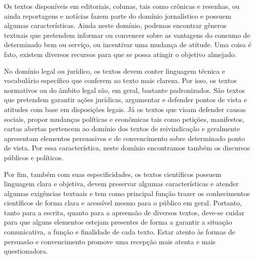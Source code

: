 {{Os textos disponíveis em editoriais, colunas, tais como crônicas e
resenhas, ou ainda reportagens e notícias fazem parte do domínio
jornalístico e possuem algumas características. Ainda neste domínio,
podemos encontrar gêneros textuais que pretendem informar ou convencer
sobre as vantagens do consumo de determinado bem ou serviço, ou
incentivar uma mudança de atitude. Uma coisa é fato, existem diversos
recursos para que se possa atingir o objetivo almejado.

No domínio legal ou jurídico, os textos devem conter linguagem técnica e
vocabulário específico que conferem ao texto mais clareza. Por isso, os
textos normativos ou do âmbito legal são, em geral, bastante
padronizados. São textos que pretendem garantir ações jurídicas,
argumentar e defender pontos de vista e atitudes com base em disposições
legais. Já os textos que visam defender causas sociais, propor mudanças
políticas e econômicas tais como petições, manifestos, cartas abertas
pertencem ao domínio dos textos de reivindicação e geralmente apresentam
elementos persuasivos e de convencimento sobre determinado ponto de
vista. Por essa característica, neste domínio encontramos também os
discursos públicos e políticos.

Por fim, também com suas especificidades, os textos científicos possuem
linguagem clara e objetiva, devem preservar algumas características e
atender algumas exigências textuais e tem como principal função trazer
os conhecimentos científicos de forma clara e acessível mesmo para o
público em geral. Portanto, tanto para a escrita, quanto para a
apreensão de diversos textos, deve-se cuidar para que alguns elementos
estejam presentes de forma a garantir a situação comunicativa, a função
e finalidade de cada texto. Estar atento às formas de persuasão e
convencimento promove uma recepção mais atenta e mais questionadora.}

}
